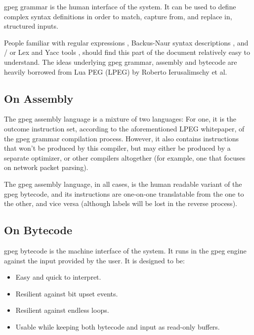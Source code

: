 gpeg grammar is the human interface of the system.
It can be used to define complex syntax definitions in order
to match, capture from, and replace in, structured inputs.

People familiar with regular expressions \cite{bib:regex},
Backus-Naur syntax descriptions \cite{bib:backusnaur},
and / or Lex and Yacc tools \cite{bib:yacc},
should find this part of the document relatively easy to understand.
The ideas underlying gpeg grammar, assembly and bytecode
are heavily borrowed from Lua PEG (LPEG) \cite{bib:peg}
by Roberto Ierusalimschy et al.

\subsection{On Assembly}

The gpeg assembly language is a mixture of two languages:
For one, it is the outcome instruction set, according to the
aforementioned LPEG whitepaper,
of the gpeg grammar compilation process. However, it also contains
instructions that won't be produced by this compiler, but may
either be produced by a separate optimizer, or other compilers
altogether (for example, one that focuses on network packet
parsing).

The gpeg assembly language, in all cases, is the human readable
variant of the gpeg bytecode, and its instructions are one-on-one
translatable from the one to the other, and vice versa
(although labels will be lost in the reverse process).

\subsection{On Bytecode}

gpeg bytecode is the machine interface of the system.
It runs in the gpeg engine against the input provided by the user.
It is designed to be:

\begin{itemize}

\item Easy and quick to interpret.
\item Resilient against bit upset events.
\item Resilient against endless loops.
\item Usable while keeping both bytecode and input as read-only buffers.

\end{itemize}
